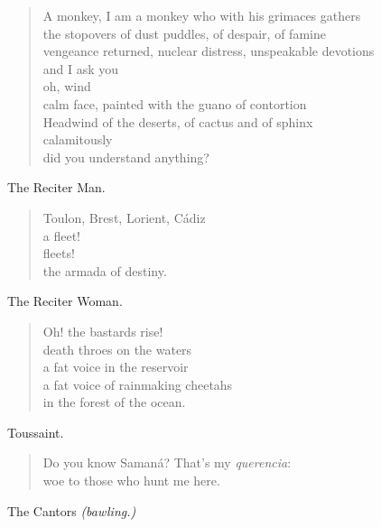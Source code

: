 \documentclass[letterpaper,article,12pt,oneside,notitlepage]{memoir}
\begin{document}
\begin{verse}
A monkey, I am a monkey who with his grimaces gathers \\
the stopovers of dust puddles, of despair, of famine \\
vengeance returned, nuclear distress, unspeakable devotions \\
and I ask you \\
oh, wind \\
calm face, painted with the guano of contortion \\
Headwind of the deserts, of cactus and of sphinx \\
calamitously \\
did you understand anything? \\
\end{verse}

\begin{center}The Reciter Man.\end{center}

\begin{verse}
Toulon, Brest, Lorient, Cádiz \\
a fleet! \\
fleets! \\
the armada of destiny. \\
\end{verse}

\begin{center}The Reciter Woman.\end{center}

\begin{verse}
Oh! the bastards rise! \\
death throes on the waters \\
a fat voice in the reservoir \\
a fat voice of rainmaking cheetahs \\
in the forest of the ocean. \\
\end{verse}

\begin{center}Toussaint.\end{center}

\begin{verse}
Do you know Samaná? That's my \textit{querencia}: \\
woe to those who hunt me here. \\
\end{verse}

\begin{center}The Cantors \textit{(bawling.)}\end{center}
\end{document}
